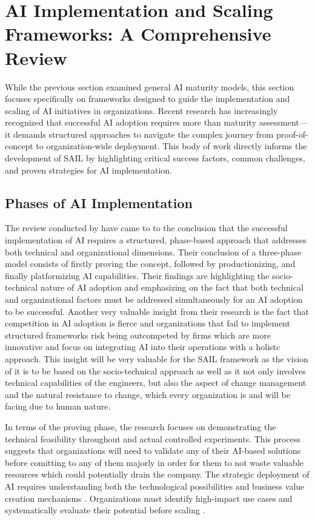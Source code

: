 \documentclass[]{imc-inf}
\begin{document}
\section{AI Implementation and Scaling Frameworks: A Comprehensive Review}\label{ai-implementation-scaling-frameworks}

While the previous section examined general AI maturity models, this section focuses specifically on frameworks designed to guide the implementation and scaling of AI initiatives in organizations. Recent research has increasingly recognized that successful AI adoption requires more than maturity assessment---it demands structured approaches to navigate the complex journey from proof-of-concept to organization-wide deployment. This body of work directly informs the development of SAIL by highlighting critical success factors, common challenges, and proven strategies for AI implementation.

\subsection{Phases of AI Implementation}



The review conducted by \citep{Haefner2023} have came to to the conclusion that the successful implementation of AI requires a structured, phase-based approach that addresses both technical and organizational dimensions. Their conclusion of a three-phase model consists of firstly proving the concept, followed by productionizing, and finally platformizing AI capabilities. Their findings are highlighting the socio-technical nature of AI adoption and emphasizing on the fact that both technical and organizational factors must be addressed simultaneously for an AI adoption to be successful. Another very valuable insight from their research is the fact that competition in AI adoption is fierce and organizations that fail to implement structured frameworks risk being outcompeted by firms which are more innovative and focus on integrating AI into their operations with a holistc approach. This insight will be very valuable for the SAIL framework as the vision of it is to be based on the socio-technical approach as well as it not only involves technical capabilities of the engineers, but also the aspect of change management and the natural resistance to change, which every organization is and will be facing due to human nature.


In terms of the proving phase, the research focuses on demonstrating the technical feasibility throughout and actual controlled experiments. This process suggests that organizations will need to validate any of their AI-based solutions before comitting to any of them majorly in order for them to not waste valuable resources which could potentially drain the company. The strategic deployment of AI requires understanding both the technological possibilities and business value creation mechanisms \citep{Iansiti2020, Chui2018}. Organizations must identify high-impact use cases and systematically evaluate their potential before scaling \citep{Davenport2020}.
\end{document}
